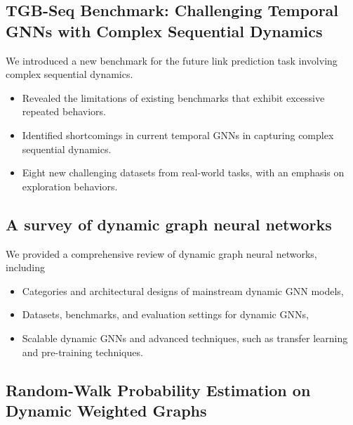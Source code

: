 \documentclass{resume}
\begin{document}
\subsection{\bf TGB-Seq Benchmark: Challenging Temporal GNNs with Complex Sequential Dynamics} 

We introduced a new benchmark for the future link prediction task involving complex sequential dynamics.
\begin{itemize}
  \item Revealed the limitations of existing benchmarks that exhibit excessive repeated behaviors.
  \item Identified shortcomings in current temporal GNNs in capturing complex sequential dynamics.
  \item Eight new challenging datasets from real-world tasks, with an emphasis on exploration behaviors.
\end{itemize}

\subsection{\bf A survey of dynamic graph neural networks} 

We provided a comprehensive review of dynamic graph neural networks, including 
\begin{itemize}
  \item Categories and architectural designs of mainstream dynamic GNN models,
  \item Datasets, benchmarks, and evaluation settings for dynamic GNNs,
  \item Scalable dynamic GNNs and advanced techniques, such as transfer learning and pre-training techniques.
\end{itemize}

\subsection{\bf Random-Walk Probability Estimation on Dynamic Weighted Graphs} 
\end{document}
